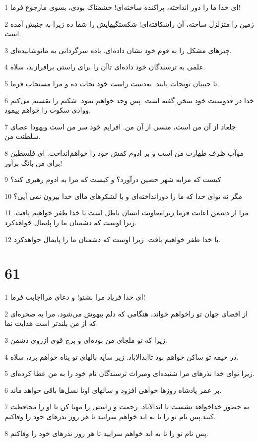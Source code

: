 \par 1 ای خدا ما را دور انداخته، پراکنده ساخته‌ای! خشمناک بودی، بسوی مارجوع فرما!
\par 2 زمین را متزلزل ساخته، آن راشکافته‌ای! شکستگیهایش را شفا ده زیرا به جنبش آمده است.
\par 3 چیزهای مشکل را به قوم خود نشان داده‌ای. باده سرگردانی به مانوشانیده‌ای.
\par 4 علمی به ترسندگان خود داده‌ای تاآن را برای راستی برافرازند، سلاه.
\par 5 تا حبیبان تونجات یابند. به‌دست راست خود نجات ده و مرا مستجاب فرما.
\par 6 خدا در قدوسیت خود سخن گفته است. پس وجد خواهم نمود. شکیم را تقسیم می‌کنم ووادی سکوت را خواهم پیمود.
\par 7 جلعاد از آن من است، منسی از آن من. افرایم خود سر من است ویهودا عصای سلطنت من.
\par 8 موآب ظرف طهارت من است و بر ادوم کفش خود را خواهم‌انداخت. ای فلسطین برای من بانگ برآور!
\par 9 کیست که مرابه شهر حصین درآورد؟ و کیست که مرا به ادوم رهبری کند؟
\par 10 مگر نه تو‌ای خدا که ما را دورانداخته‌ای و با لشکرهای ما‌ای خدا بیرون نمی آیی؟
\par 11 مرا از دشمن اعانت فرما زیرامعاونت انسان باطل است.با خدا ظفر خواهیم یافت. زیرا اوست که دشمنان ما را پایمال خواهدکرد.
\par 12 با خدا ظفر خواهیم یافت. زیرا اوست که دشمنان ما را پایمال خواهدکرد.
 
\chapter{61}

\par 1 ای خدا فریاد مرا بشنو! و دعای مرااجابت فرما!
\par 2 از اقصای جهان تو راخواهم خواند، هنگامی که دلم بیهوش می‌شود، مرا به صخره‌ای که از من بلندتر است هدایت نما.
\par 3 زیرا که تو ملجای من بوده‌ای و برج قوی ازروی دشمن.
\par 4 در خیمه تو ساکن خواهم بود تاابدالاباد. زیر سایه بالهای تو پناه خواهم برد، سلاه.
\par 5 زیرا تو‌ای خدا نذرهای مرا شنیده‌ای ومیراث ترسندگان نام خود را به من عطا کرده‌ای.
\par 6 بر عمر پادشاه روزها خواهی افزود و سالهای اوتا نسل‌ها باقی خواهد ماند.
\par 7 به حضور خداخواهد نشست تا ابدالاباد. رحمت و راستی را مهیا کن تا او را محافظت کنند.پس نام تو را تا به ابد خواهم سرایید تا هر روز نذرهای خود را وفاکنم.
\par 8 پس نام تو را تا به ابد خواهم سرایید تا هر روز نذرهای خود را وفاکنم.
 
